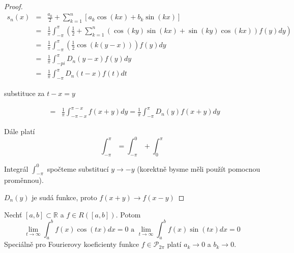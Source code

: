 \begin{proof}
\begin{eqnarray*}
s_n(x) & = & \frac{a_0}{2} + \sum_{k=1}^{n} \left[ a_k \cos(kx) + b_k \sin(kx) \right] \\
& = & \frac{1}{\pi} \int_{-\pi}^\pi \left( \frac{1}{2} + \sum_{k=1}^n \left( \cos(ky) \sin(kx) + \sin(ky) \cos (kx) \right) f(y) dy \right) \\
& = & \frac{1}{\pi} \int_{-\pi}^\pi \left( \frac{1}{2} \cos(k(y-x))  \right) f(y) dy \\
& = & \frac{1}{\pi} \int_{-pi}^\pi D_n(y-x) f(y) dy \\
& = & \frac{1}{\pi} \int_{-\pi}^\pi D_n(t-x) f(t) dt 
\end{eqnarray*}

substituce za $t-x=y$

\begin{eqnarray*}
& = & \frac{1}{\pi} \int_{-\pi -x}^{\pi-x} f(x+y) dy = \frac{1}{\pi} \int_{-\pi}^\pi D_n(y) f(x+y) dy 
\end{eqnarray*}

Dále platí 
$$\int_{-\pi}^\pi = \int_{-\pi}^0 + \int_{0}^\pi$$

Integrál $\int_{-\pi}^0$ spočteme substitucí $y \rightarrow -y$ (korektně bysme měli použít pomocnou proměnnou).

$D_n(y)$ je sudá funkce, proto $f(x+y) \rightarrow f(x-y)$
\end{proof}

\begin{vetat}
\label{Riemann-Lebesqueovo lemma}
Nechť $[a,b] \subset \mathbb{R}$ a $f \in R([a,b])$. Potom
$$\lim_{t \rightarrow \infty} \int_a^b f(x) \cos(tx) dx = 0 \textrm{ a } \lim_{t \rightarrow \infty} \int_a^b f(x) \sin(tx) dx = 0$$
Speciálně pro Fourierovy koeficienty funkce $f \in \mathcal{P}_{2 \pi}$ platí $a_k \rightarrow 0$ a $b_k \rightarrow 0$.
\end{vetat}

